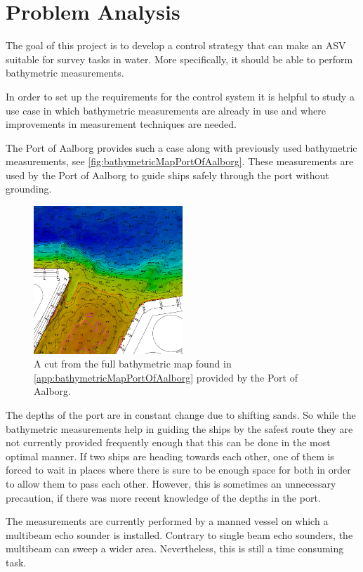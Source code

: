 \chapter{Problem Analysis}
%
The goal of this project is to develop a control strategy that can make an ASV suitable for survey tasks in water. More specifically, it should be able to perform bathymetric measurements.

In order to set up the requirements for the control system it is helpful to study a use case in which bathymetric measurements are already in use and where improvements in measurement techniques are needed.

The Port of Aalborg provides such a case along with previously used bathymetric measurements, see \autoref{fig:bathymetricMapPortOfAalborg}. These measurements are used by the Port of Aalborg to guide ships safely through the port without grounding.

\begin{figure}[H]
  \includegraphics[width=0.5\textwidth]{figures/smallDebthMapAalborg}
  \caption{A cut from the full bathymetric map found in \autoref{app:bathymetricMapPortOfAalborg} provided by the Port of Aalborg.}
  \label{fig:bathymetricMapPortOfAalborg}
\end{figure}

The depths of the port are in constant change due to shifting sands. So while the bathymetric measurements help in guiding the ships by the safest route they are not currently provided frequently enough that this can be done in the most optimal manner. If two ships are heading towards each other, one of them is forced to wait in places where there is sure to be enough space for both in order to allow them to pass each other. However, this is sometimes an unnecessary precaution, if there was more recent knowledge of the depths in the port.

The measurements are currently performed by a manned vessel on which a multibeam echo sounder is installed. Contrary to single beam echo sounders, the multibeam can sweep a wider area. Nevertheless, this is still a time consuming task.

